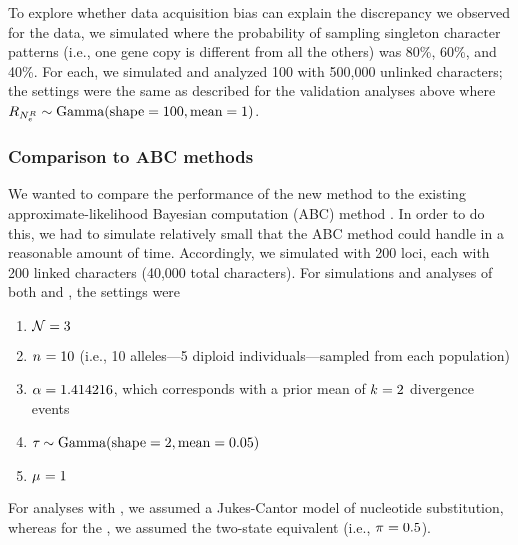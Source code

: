To explore whether data acquisition bias can explain the discrepancy we
observed for the  data, we simulated \datasets where the probability
of sampling singleton character patterns (i.e., one gene copy is different from
all the others) was 80\%, 60\%, and 40\%.
For each, we simulated and analyzed 100 \datasets with 500,000 unlinked
characters; the settings were the same as described for the validation analyses
above where
$R_{N_{e}^{R{}}} \sim \textrm{Gamma}(\textrm{shape} = 100, \textrm{mean} = 1)$.


\subsubsection{Comparison to ABC methods}
We wanted to compare the performance of the new method to the existing
approximate-likelihood Bayesian computation (ABC) method \dppmsbayes 
\citep{Oaks2014dpp}.
In order to do this, we had to simulate relatively small \datasets that the ABC
method could handle in a reasonable amount of time.
Accordingly, we simulated \datasets with 200 loci, each with 200 linked
characters (40,000 total characters).
For simulations and analyses of both \ecoevolity and \dppmsbayes, the settings
were
\begin{enumerate}
    \item $\mathcal{N} = 3$
    \item $n_{}^{} = 10$ (i.e., 10 alleles---5 diploid
        individuals---sampled from each population)
    \item $\alpha = 1.414216$, which corresponds with a prior mean of
        $k_{} = 2$ divergence events
    \item $\tau_{} \sim \textrm{Gamma}(\textrm{shape} = 2, \textrm{mean} = 0.05)$
    \item $\mu_{} = 1$
\end{enumerate}
For analyses with \dppmsbayes, we assumed a Jukes-Cantor model of nucleotide
substitution, whereas for the \ecoevolity, we assumed the two-state equivalent
(i.e., $\pi_{} = 0.5$).

